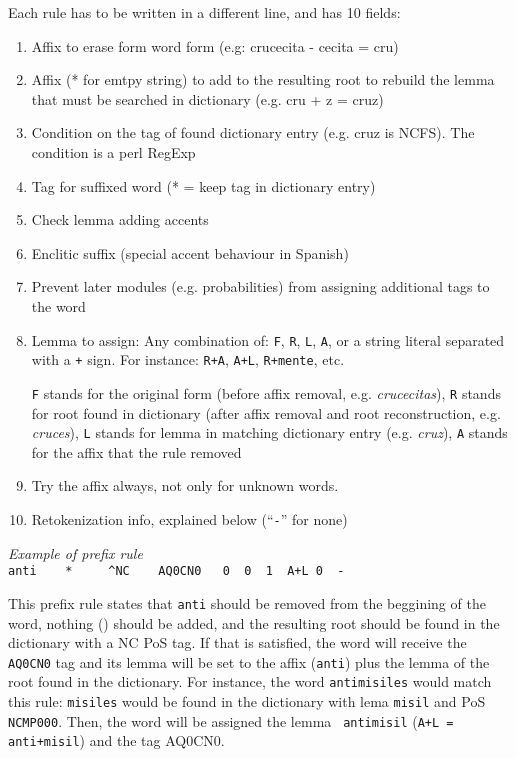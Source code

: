 \documentclass[a4paper]{book}
\begin{document}
Each rule has to be written in a different line, and has 10 fields:
\begin{enumerate}
 \itemsep 0cm
 \item Affix to erase form word form (e.g: crucecita - cecita = cru)
 \item Affix (* for emtpy string) to add to the resulting root to
   rebuild the lemma that must be searched in dictionary (e.g. cru + z
   = cruz)
 \item Condition on the tag of found dictionary entry (e.g. cruz is
   NCFS). The condition is a perl RegExp
 \item Tag for suffixed word (* = keep tag in dictionary entry)
 \item Check lemma adding accents
 \item Enclitic suffix (special accent behaviour in Spanish)
 \item Prevent later modules (e.g. probabilities) from assigning
   additional tags to the word
 \item Lemma to assign: Any combination of: {\tt F}, {\tt R}, {\tt L},
   {\tt A}, or a string literal separated with a {\tt +} sign. For
   instance: {\tt R+A}, {\tt A+L}, {\tt R+mente}, etc.

  {\tt F} stands for the original form (before affix removal,
  e.g. {\em crucecitas}), {\tt R} stands for root found in dictionary
  (after affix removal and root reconstruction, e.g. {\em cruces}),
  {\tt L} stands for lemma in matching dictionary entry (e.g. {\em
    cruz}), {\tt A} stands for the affix that the rule removed

 \item Try the affix always, not only for unknown words.

 \item Retokenization info, explained below (``\verb#-#'' for none)
\end{enumerate}
\medskip

 \noindent \textit{Example of prefix rule}\\
 \verb#anti    *     ^NC    AQ0CN0   0  0  1  A+L 0  -#

  This prefix rule states that {\tt anti} should be removed from the
  beggining of the word, nothing ({\tt *}) should be added, and the
  resulting root should be found in the dictionary with a NC PoS
  tag. If that is satisfied, the word will receive the {\tt AQ0CN0}
  tag and its lemma will be set to the affix ({\tt anti}) plus the
  lemma of the root found in the dictionary.  For instance, the word
  {\tt antimisiles} would match this rule: {\tt misiles} would be
  found in the dictionary with lema {\tt misil} and PoS {\tt
    NCMP000}. Then, the word will be assigned the lemma {\tt
    antimisil} ({\tt A+L = anti+misil}) and the tag AQ0CN0.
\medskip
\end{document}
